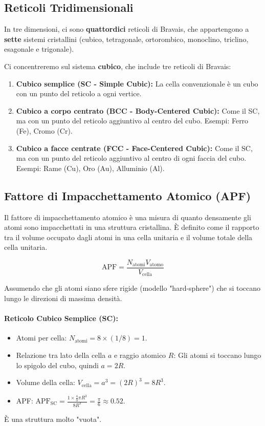 \subsection*{Reticoli Tridimensionali}

In tre dimensioni, ci sono \textbf{quattordici} reticoli di Bravais, che appartengono a \textbf{sette} sistemi cristallini (cubico, tetragonale, ortorombico, monoclino, triclino, esagonale e trigonale).

Ci concentreremo sul sistema \textbf{cubico}, che include tre reticoli di Bravais:
\begin{enumerate}
    \item \textbf{Cubico semplice (SC - Simple Cubic):} La cella convenzionale è un cubo con un punto del reticolo a ogni vertice.
    \item \textbf{Cubico a corpo centrato (BCC - Body-Centered Cubic):} Come il SC, ma con un punto del reticolo aggiuntivo al centro del cubo. Esempi: Ferro (Fe), Cromo (Cr).
    \item \textbf{Cubico a facce centrate (FCC - Face-Centered Cubic):} Come il SC, ma con un punto del reticolo aggiuntivo al centro di ogni faccia del cubo. Esempi: Rame (Cu), Oro (Au), Alluminio (Al).
\end{enumerate}

\subsection*{Fattore di Impacchettamento Atomico (APF)}

Il fattore di impacchettamento atomico è una misura di quanto densamente gli atomi sono impacchettati in una struttura cristallina. È definito come il rapporto tra il volume occupato dagli atomi in una cella unitaria e il volume totale della cella unitaria.

\begin{equation}
 \text{APF} = \frac{N_{\text{atomi}} V_{\text{atomo}}}{V_{\text{cella}}}
\end{equation}

Assumendo che gli atomi siano sfere rigide (modello "hard-sphere") che si toccano lungo le direzioni di massima densità.

\paragraph{Reticolo Cubico Semplice (SC):}
\begin{itemize}
    \item Atomi per cella: $N_{\text{atomi}} = 8 \times (1/8) = 1$.
    \item Relazione tra lato della cella $a$ e raggio atomico $R$: Gli atomi si toccano lungo lo spigolo del cubo, quindi $a = 2R$.
    \item Volume della cella: $V_{\text{cella}} = a^3 = (2R)^3 = 8R^3$.
    \item APF: $\text{APF}_{\text{SC}} = \frac{1 \times \frac{4}{3}\pi R^3}{8R^3} = \frac{\pi}{6} \approx 0.52$.
\end{itemize}
È una struttura molto "vuota".

